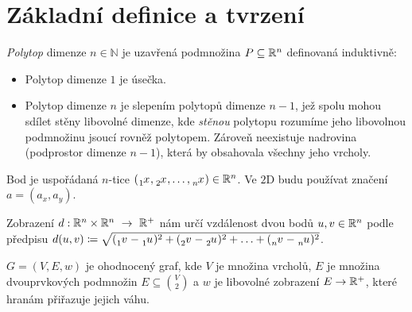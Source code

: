 \chapter*{Základní definice a tvrzení}
\label{sec:zakladni-pojmy}

\begin{definition}[Polytop]
  \emph{Polytop} dimenze $n \in \mathbb{N}$ je uzavřená podmnožina $P \subseteq \mathbb{R}^{n}$ definovaná induktivně:
  \begin{itemize}[topsep=6pt]
    \item Polytop dimenze $1$ je úsečka.
    \item Polytop dimenze $n$ je slepením polytopů dimenze $n-1$, jež spolu mohou
          sdílet stěny libovolné dimenze, kde \emph{stěnou} polytopu rozumíme jeho
          libovolnou podmnožinu jsoucí rovněž polytopem.
          Zároveň neexistuje nadrovina (podprostor dimenze $n - 1$), která by obsahovala všechny jeho vrcholy.
          \autocite{adamklepacDefinicePolytopu2024}
  \end{itemize}

\end{definition}

\begin{definition}[Bod]
  \label{definice:bod}
  Bod je uspořádaná $n$-tice $(\xx{1}, \xx{2}, \ldots, \xx{n}) \in \R^n$. Ve $2$D budu používat značení $a=(a_x, a_y)$.
\end{definition}

\begin{definition}[Vzdálenost]
  \label{definice:vzdalenost}
  Zobrazení $d: \mathbb{R}^n\times \mathbb{R}^n~\rightarrow~\mathbb{R}^+$ nám určí vzdálenost dvou bodů $u, v \in \mathbb{R}^n$
  podle předpisu $d(u, v) \coloneqq \sqrt{(\vvv{1}-\uu{1})^2+(\vvv{2}-\uu{2})^2+\ldots+(\vvv{n}-\uu{n})^2}$.
\end{definition}

\begin{definition}
  \label{definice:ohodnoceny_graf}
  $G = (V, E, w)$ je ohodnocený graf, kde $V$ je množina vrcholů, $E$ je množina dvouprvkových podmnožin $E \subseteq \binom{V}{2}$ a $w$ je libovolné zobrazení $E \rightarrow \mathbb{R}^+$, které hranám přiřazuje jejich váhu.
\end{definition}

